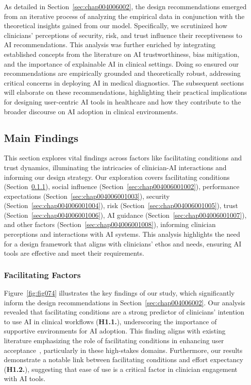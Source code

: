 \textcolor{revised}{As detailed in Section~\ref{sec:chap004006002}, the design recommendations emerged from an iterative process of analyzing the empirical data in conjunction with the theoretical insights gained from our model.
Specifically, we scrutinized how clinicians' perceptions of security, risk, and trust influence their receptiveness to \ac{AI} recommendations.
This analysis was further enriched by integrating established concepts from the literature on \ac{AI} trustworthiness, bias mitigation, and the importance of explainable \ac{AI} in clinical settings.
Doing so ensured our recommendations are empirically grounded and theoretically robust, addressing critical concerns in deploying \ac{AI} in medical diagnostics.
The subsequent sections will elaborate on these recommendations, highlighting their practical implications for designing user-centric \ac{AI} tools in healthcare and how they contribute to the broader discourse on \ac{AI} adoption in clinical environments.}

\subsection{Main Findings}
\label{sec:chap004006001}

\textcolor{revised}{This section explores vital findings across factors like facilitating conditions and trust dynamics, illuminating the intricacies of clinician-\ac{AI} interactions and informing our design strategy.
Our exploration covers facilitating conditions (Section~\ref{sec:chap004006001001}), social influence (Section~\ref{sec:chap004006001002}), performance expectations (Section~\ref{sec:chap004006001003}), security (Section~\ref{sec:chap004006001004}), risk (Section~\ref{sec:chap004006001005}), trust (Section~\ref{sec:chap004006001006}), \ac{AI} guidance (Section~\ref{sec:chap004006001007}), and other factors (Section~\ref{sec:chap004006001008}), informing clinician perceptions and interactions with \ac{AI} systems.
This analysis highlights the need for a design framework that aligns with clinicians' ethos and needs, ensuring \ac{AI} tools are effective and meet their requirements.}

\subsubsection{Facilitating Factors}
\label{sec:chap004006001001}

\textcolor{revised}{Figure~\ref{fig:fig074} illustrates the key findings of our study, which significantly inform the design recommendations in Section~\ref{sec:chap004006002}.
Our analysis revealed that facilitating conditions are a strong predictor of clinicians' intention to use \ac{AI} in clinical workflows ({\bf H1.1.}), underscoring the importance of supportive environments for \ac{AI} adoption.
This finding aligns with existing literature emphasizing the role of facilitating conditions in enhancing user acceptance~\cite{Lambert2023, KHANIJAHANI2022100602}, particularly in these high-stakes domains.
Furthermore, our results demonstrate a notable link between facilitating conditions and effort expectancy ({\bf H1.2.}), suggesting that ease of use is a critical factor in clinician engagement with \ac{AI} tools.}

